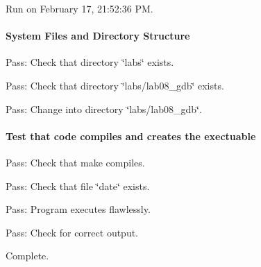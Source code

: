 Run on February 17, 21\+:52\+:36 PM.

\paragraph*{System Files and Directory Structure}


\begin{DoxyItemize}
\item Pass\+: Check that directory \char`\"{}labs\char`\"{} exists.
\item Pass\+: Check that directory \char`\"{}labs/lab08\+\_\+gdb\char`\"{} exists.
\item Pass\+: Change into directory \char`\"{}labs/lab08\+\_\+gdb\char`\"{}.
\end{DoxyItemize}

\paragraph*{Test that code compiles and creates the exectuable}


\begin{DoxyItemize}
\item Pass\+: Check that make compiles.
\item Pass\+: Check that file \char`\"{}date\char`\"{} exists.
\item Pass\+: Program executes flawlessly.
\item Pass\+: Check for correct output.

Complete. 
\end{DoxyItemize}